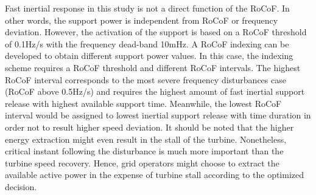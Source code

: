 Fast inertial response in this study is not a direct function of the RoCoF. In other words, the support power is independent from RoCoF or frequency deviation. However, the activation of the support is based on a RoCoF threshold of 0.1Hz/s with the frequency dead-band 10mHz. A RoCoF indexing can be developed to obtain different support power values. In this case, the indexing scheme requires a RoCoF threshold and different RoCoF intervals. The highest RoCoF interval corresponds to the most severe frequency disturbances case (RoCoF above 0.5Hz/s) and requires the highest amount of fast inertial support release with highest available support time. Meanwhile, the lowest RoCoF interval would be assigned to lowest inertial support release with time duration in order not to result higher speed deviation. It should be noted that the higher energy extraction might even result in the stall of the turbine. Nonetheless, critical instant following the disturbance is much more important than the turbine speed recovery. Hence, grid operators might choose to extract the available active power in the expense of turbine stall according to the optimized decision.
